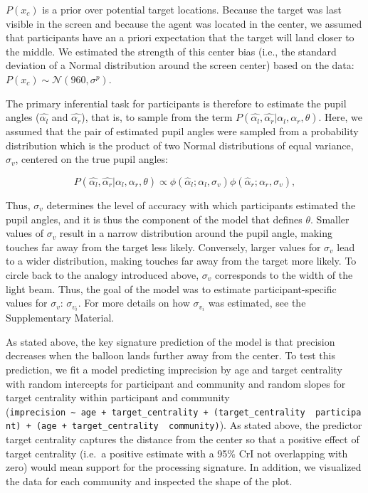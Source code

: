 \documentclass[
  man,floatsintext]{apa7}
\begin{document}
\(P(x_c)\) is a prior over potential target locations. Because the target was last visible in the screen and because the agent was located in the center, we assumed that participants have an a priori expectation that the target will land closer to the middle. We estimated the strength of this center bias (i.e., the standard deviation of a Normal distribution around the screen center) based on the data: \(P(x_c) \sim \mathcal{N}(960, \sigma^p)\).

The primary inferential task for participants is therefore to estimate the pupil angles (\(\hat{\alpha_l}\) and \(\hat{\alpha_r}\)), that is, to sample from the term \(P(\hat{\alpha_l}, \hat{\alpha_r} | \alpha_l, \alpha_r, \theta)\). Here, we assumed that the pair of estimated pupil angles were sampled from a probability distribution which is the product of two Normal distributions of equal variance, \(\sigma_v\), centered on the true pupil angles:

\begin{equation}
P(\hat{\alpha_l}, \hat{\alpha_r} | \alpha_l, \alpha_r, \theta) \propto \phi(\hat{\alpha}_l ; \alpha_l, \sigma_v)\phi(\hat{\alpha}_r ; \alpha_r, \sigma_v),
\end{equation}

Thus, \(\sigma_v\) determines the level of accuracy with which participants estimated the pupil angles, and it is thus the component of the model that defines \(\theta\). Smaller values of \(\sigma_v\) result in a narrow distribution around the pupil angle, making touches far away from the target less likely. Conversely, larger values for \(\sigma_v\) lead to a wider distribution, making touches far away from the target more likely. To circle back to the analogy introduced above, \(\sigma_v\) corresponds to the width of the light beam. Thus, the goal of the model was to estimate participant-specific values for \(\sigma_v\): \(\sigma_{v_i}\). For more details on how \(\sigma_{v_i}\) was estimated, see the Supplementary Material.

As stated above, the key signature prediction of the model is that precision decreases when the balloon lands further away from the center. To test this prediction, we fit a model predicting imprecision by age and target centrality with random intercepts for participant and community and random slopes for target centrality within participant and community (\texttt{imprecision\ \textasciitilde{}\ age\ +\ target\_centrality\ +\ (target\_centrality\ \textbar{}\ participant)\ +\ (age\ +\ target\_centrality\ \textbar{}\ community)}). As stated above, the predictor target centrality captures the distance from the center so that a positive effect of target centrality (i.e.~a positive estimate with a 95\% CrI not overlapping with zero) would mean support for the processing signature. In addition, we visualized the data for each community and inspected the shape of the plot.
\end{document}
